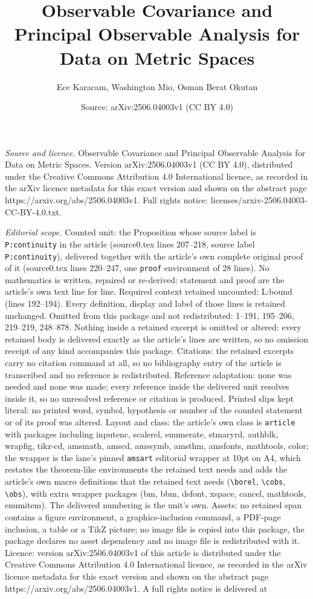 \documentclass[10pt,a4paper]{amsart}
\title[Observable Covariance and Principal Observable Analysis for ]{Observable Covariance and Principal Observable Analysis for Data on Metric Spaces}
\author{Ece Karacam, Washington Mio, Osman Berat Okutan}
\date{Source: arXiv:2506.04003v1 (CC BY 4.0)}
\begin{document}
\maketitle

\noindent\emph{Source and licence.} Observable Covariance and Principal Observable Analysis for Data on Metric Spaces. Version arXiv:2506.04003v1 (CC BY 4.0), distributed under the Creative Commons Attribution 4.0 International licence, as recorded in the arXiv licence metadata for this exact version and shown on the abstract page https://arxiv.org/abs/2506.04003v1. Full rights notice: licenses/arxiv-2506.04003-CC-BY-4.0.txt.\par\smallskip

\noindent\textit{Editorial scope.} Counted unit: the Proposition whose source label is \texttt{P:continuity} in the article (source0.tex lines 207--218, source label \texttt{P:continuity}), delivered together with the article's own complete original proof of it (source0.tex lines 220--247, one \texttt{proof} environment of 28 lines). No mathematics is written, repaired or re-derived: statement and proof are the article's own text line for line. Required context retained uncounted: L:bound (lines 192--194). Every definition, display and label of those lines is retained unchanged. Omitted from this package and not redistributed: 1--191, 195--206, 219--219, 248--878. Nothing inside a retained excerpt is omitted or altered: every retained body is delivered exactly as the article's lines are written, so no omission receipt of any kind accompanies this package. Citations: the retained excerpts carry no citation command at all, so no bibliography entry of the article is transcribed and no reference is redistributed. Reference adaptation: none was needed and none was made; every reference inside the delivered unit resolves inside it, so no unresolved reference or citation is produced. Printed slips kept literal: no printed word, symbol, hypothesis or number of the counted statement or of its proof was altered. Layout and class: the article's own class is \texttt{article} with packages including inputenc, scalerel, enumerate, stmaryrd, authblk, wrapfig, tikz-cd, amsmath, amscd, amssymb, amsthm, amsfonts, mathtools, color; the wrapper is the lane's pinned \texttt{amsart} editorial wrapper at 10pt on A4, which restates the theorem-like environments the retained text needs and adds the article's own macro definitions that the retained text needs (\texttt{\textbackslash borel}, \texttt{\textbackslash cobs}, \texttt{\textbackslash obs}), with extra wrapper packages (bm, bbm, dsfont, xspace, cancel, mathtools, enumitem). The delivered numbering is the unit's own. Assets: no retained span contains a figure environment, a graphics-inclusion command, a PDF-page inclusion, a table or a TikZ picture; no image file is copied into this package, the package declares no asset dependency and no image file is redistributed with it. Licence: version arXiv:2506.04003v1 of this article is distributed under the Creative Commons Attribution 4.0 International licence, as recorded in the arXiv licence metadata for this exact version and shown on the abstract page https://arxiv.org/abs/2506.04003v1. A full rights notice is delivered at 
\end{document}
